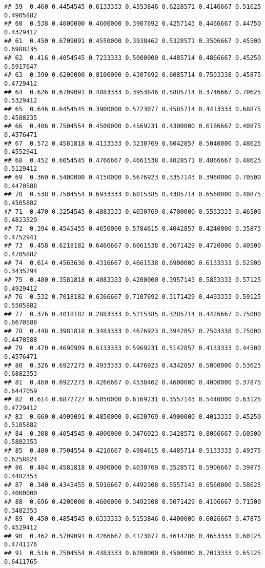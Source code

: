 \documentclass[
]{article}
\begin{document}
\begin{verbatim}
## 59  0.460 0.4454545 0.6133333 0.4553846 0.6228571 0.4146667 0.51625 0.4905882
## 60  0.538 0.4000000 0.4600000 0.3907692 0.4257143 0.4466667 0.44750 0.4329412
## 61  0.450 0.6709091 0.4550000 0.3938462 0.5328571 0.3506667 0.45500 0.6988235
## 62  0.416 0.4054545 0.7233333 0.5000000 0.4485714 0.4866667 0.45250 0.5917647
## 63  0.390 0.6200000 0.8100000 0.4307692 0.6085714 0.7503338 0.45875 0.4729412
## 64  0.626 0.6709091 0.4883333 0.3953846 0.5885714 0.3746667 0.70625 0.5329412
## 65  0.646 0.6454545 0.3900000 0.5723077 0.4585714 0.4413333 0.68875 0.4588235
## 66  0.406 0.7504554 0.4500000 0.4569231 0.4300000 0.6186667 0.40875 0.4576471
## 67  0.572 0.4581818 0.4133333 0.3230769 0.6042857 0.5040000 0.48625 0.4552941
## 68  0.452 0.6054545 0.4766667 0.4661538 0.4028571 0.4866667 0.48625 0.5129412
## 69  0.360 0.5400000 0.4150000 0.5676923 0.3357143 0.3960000 0.70500 0.4470588
## 70  0.538 0.7504554 0.6933333 0.6015385 0.4385714 0.6560000 0.40875 0.4505882
## 71  0.470 0.3254545 0.4883333 0.4030769 0.4700000 0.5533333 0.46500 0.4823529
## 72  0.394 0.4545455 0.4650000 0.5784615 0.4042857 0.4240000 0.35875 0.4752941
## 73  0.458 0.6218182 0.6466667 0.6061538 0.3671429 0.4720000 0.40500 0.4705882
## 74  0.614 0.4563636 0.4316667 0.4661538 0.6900000 0.6133333 0.52500 0.3435294
## 75  0.480 0.3581818 0.4083333 0.4200000 0.3957143 0.5853333 0.57125 0.4929412
## 76  0.532 0.7018182 0.6366667 0.7107692 0.3171429 0.4493333 0.59125 0.5505882
## 77  0.376 0.4018182 0.2883333 0.5215385 0.3285714 0.4426667 0.75000 0.6670588
## 78  0.448 0.3981818 0.3483333 0.4676923 0.3942857 0.7503338 0.75000 0.4470588
## 79  0.470 0.4690909 0.6133333 0.5969231 0.5142857 0.4133333 0.44500 0.4576471
## 80  0.326 0.6927273 0.4933333 0.4476923 0.4342857 0.5000000 0.53625 0.6882353
## 81  0.460 0.6927273 0.4266667 0.4538462 0.4600000 0.4000000 0.37875 0.6447059
## 82  0.614 0.6872727 0.5050000 0.6169231 0.3557143 0.5440000 0.63125 0.4729412
## 83  0.660 0.4909091 0.4850000 0.4630769 0.4900000 0.4013333 0.45250 0.5105882
## 84  0.308 0.4054545 0.4000000 0.3476923 0.3428571 0.8066667 0.60500 0.5882353
## 85  0.480 0.7504554 0.4216667 0.4984615 0.4485714 0.5133333 0.49375 0.6258824
## 86  0.484 0.4581818 0.4900000 0.4030769 0.3528571 0.5906667 0.39875 0.4482353
## 87  0.340 0.4345455 0.5916667 0.4492308 0.5557143 0.6560000 0.58625 0.4000000
## 88  0.696 0.4200000 0.4600000 0.3492308 0.5071429 0.4106667 0.71500 0.3482353
## 89  0.450 0.4854545 0.6333333 0.5153846 0.4400000 0.6026667 0.47875 0.4529412
## 90  0.462 0.5709091 0.4266667 0.4123077 0.4614286 0.4653333 0.60125 0.4741176
## 91  0.516 0.7504554 0.4383333 0.6200000 0.4500000 0.7013333 0.65125 0.6411765

\end{verbatim}
\end{document}
